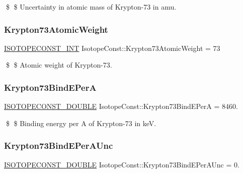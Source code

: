 \$ \$ Uncertainty in atomic mass of Krypton-\/73 in amu. \mbox{\label{group___isotope_const-_krypton-_kr73_ga656dfd92f2ff773ea1d528d69eb1ca31}} 
\subsubsection{\texorpdfstring{Krypton73\+Atomic\+Weight}{Krypton73AtomicWeight}}
{\footnotesize\ttfamily \mbox{\hyperlink{group___isotope_const-_macros_ga5f18360b3e99483a35c32d789e62621c}{I\+S\+O\+T\+O\+P\+E\+C\+O\+N\+S\+T\+\_\+\+I\+NT}} Isotope\+Const\+::\+Krypton73\+Atomic\+Weight = 73}

\$ \$ Atomic weight of Krypton-\/73. \mbox{\label{group___isotope_const-_krypton-_kr73_ga10dc164750d25e8db6188ca1d7dc9075}} 
\subsubsection{\texorpdfstring{Krypton73\+Bind\+E\+PerA}{Krypton73BindEPerA}}
{\footnotesize\ttfamily \mbox{\hyperlink{group___isotope_const-_macros_ga8f45a7272ce02c0b4c65c44636ed719a}{I\+S\+O\+T\+O\+P\+E\+C\+O\+N\+S\+T\+\_\+\+D\+O\+U\+B\+LE}} Isotope\+Const\+::\+Krypton73\+Bind\+E\+PerA = 8460.}

\$ \$ Binding energy per A of Krypton-\/73 in keV. \mbox{\label{group___isotope_const-_krypton-_kr73_gab14e4f8644dc72e3775c2dc6da355e86}} 
\subsubsection{\texorpdfstring{Krypton73\+Bind\+E\+Per\+A\+Unc}{Krypton73BindEPerAUnc}}
{\footnotesize\ttfamily \mbox{\hyperlink{group___isotope_const-_macros_ga8f45a7272ce02c0b4c65c44636ed719a}{I\+S\+O\+T\+O\+P\+E\+C\+O\+N\+S\+T\+\_\+\+D\+O\+U\+B\+LE}} Isotope\+Const\+::\+Krypton73\+Bind\+E\+Per\+A\+Unc = 0.}


